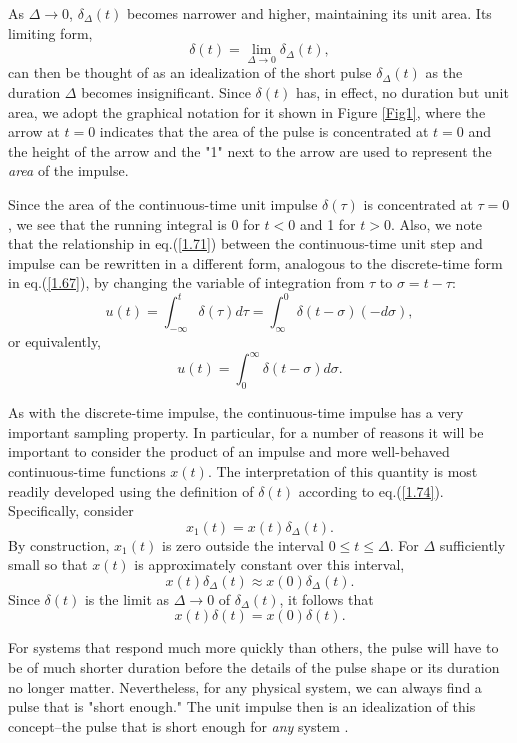 \documentclass[a4paper,twoside]{book}
\begin{document}
As $\Delta\to 0$, $\delta_{\Delta}(t)$ becomes narrower and higher, maintaining its unit area. Its limiting form,
\begin{equation}
    \delta(t) = \lim_{\Delta\to0}\delta_{\Delta}(t),
    \label{1.74}
\end{equation}
can then be thought of as an idealization of the short pulse $\delta_{\Delta}(t)$ as the duration $\Delta$ becomes insignificant. Since $\delta(t)$ has, in effect, no duration but unit area, we adopt the graphical notation for it shown in Figure \ref{Fig1}, where the arrow at $t=0$ indicates that the area of the pulse is concentrated at $t=0$ and the height of the arrow and the "1" next to the arrow are used to represent the \textit{area} of the impulse.

Since the area of the continuous-time unit impulse $\delta(\tau)$ is concentrated at $\tau=0$, we see that the running integral is 0 for $t<0$ and 1 for $t>0$. Also, we note that the relationship in eq.\;(\ref{1.71}) between the continuous-time unit step and impulse can be rewritten in a different form, analogous to the discrete-time form in eq.\;(\ref{1.67}), by changing the variable of integration from $\tau$ to $\sigma=t-\tau$:$$u(t) = \int_{-\infty}^{t}\delta(\tau) d\tau = \int_{\infty}^{0}\delta(t-\sigma)(-d\sigma),$$ or equivalently,
\begin{equation}
    u(t)=\int_0^\infty\delta(t-\sigma) d\sigma.
    \label{1.75}
\end{equation}

As with the discrete-time impulse, the continuous-time impulse has a very important sampling property. In particular, for a number of reasons it will be important to consider the product of an impulse and more well-behaved continuous-time functions $x(t)$. The interpretation of this quantity is most readily developed using the definition of $\delta(t)$ according to eq.\;(\ref{1.74}). Specifically, consider $$x_1(t)=x(t)\delta_{\Delta}(t).$$ By construction, $x_1(t)$ is zero outside the interval $0\le t\le\Delta$. For $\Delta$ sufficiently small so that $x(t)$ is approximately constant over this interval, $$x(t)\delta_{\Delta}(t)\approx x(0)\delta_{\Delta}(t).$$ Since $\delta(t)$ is the limit as $\Delta\to 0$ of $\delta_{\Delta}(t)$, it follows that
\begin{equation}
    x(t)\delta(t)=x(0)\delta(t).
\end{equation}

For systems that respond much more quickly than others, the pulse will have to be of much shorter duration before the details of the pulse shape or its duration no longer matter. Nevertheless, for any physical system, we can always find a pulse that is "short enough." The unit impulse then is an idealization of this concept--the pulse that is short enough for \textit{any} system
.
\end{document}
